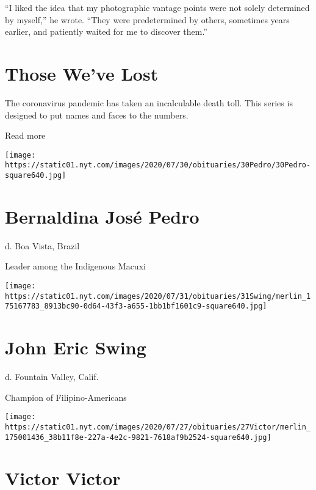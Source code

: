 ``I liked the idea that my photographic vantage points were not solely
determined by myself,'' he wrote. ``They were predetermined by others,
sometimes years earlier, and patiently waited for me to discover them.''

\href{https://www.nytimes.com/interactive/2020/obituaries/people-died-coronavirus-obituaries.html?action=click\&pgtype=Article\&state=default\&region=BELOW_MAIN_CONTENT\&context=covid_obits_promo}{}

\hypertarget{those-weve-lost}{%
\section{Those We've Lost}\label{those-weve-lost}}

The coronavirus pandemic has taken an incalculable death toll. This
series is designed to put names and faces to the numbers.

Read more

\texttt{[image: https://static01.nyt.com/images/2020/07/30/obituaries/30Pedro/30Pedro-square640.jpg]}

\hypertarget{bernaldina-josuxe9-pedro}{%
\section{Bernaldina José Pedro}\label{bernaldina-josuxe9-pedro}}

d. Boa Vista, Brazil

Leader among the Indigenous Macuxi

\texttt{[image: https://static01.nyt.com/images/2020/07/31/obituaries/31Swing/merlin\_175167783\_8913bc90-0d64-43f3-a655-1bb1bf1601c9-square640.jpg]}

\hypertarget{john-eric-swing}{%
\section{John Eric Swing}\label{john-eric-swing}}

d. Fountain Valley, Calif.

Champion of Filipino-Americans

\texttt{[image: https://static01.nyt.com/images/2020/07/27/obituaries/27Victor/merlin\_175001436\_38b11f8e-227a-4e2c-9821-7618af9b2524-square640.jpg]}

\hypertarget{victor-victor}{%
\section{Victor Victor}\label{victor-victor}}

